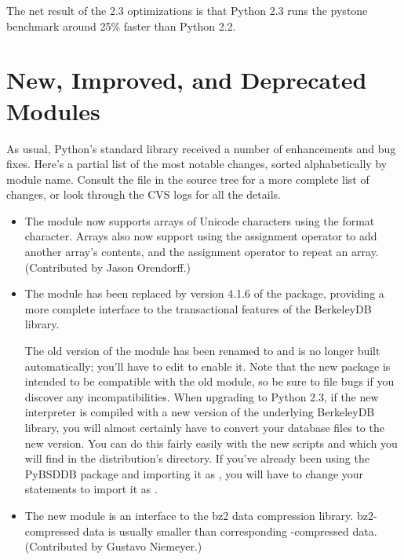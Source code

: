 \documentclass{howto}
\begin{document}
The net result of the 2.3 optimizations is that Python 2.3 runs the 
pystone benchmark around 25\% faster than Python 2.2.


\section{New, Improved, and Deprecated Modules}

As usual, Python's standard library received a number of enhancements and
bug fixes.  Here's a partial list of the most notable changes, sorted
alphabetically by module name. Consult the
 file in the source tree for a more
complete list of changes, or look through the CVS logs for all the
details.

\begin{itemize}

\item The  module now supports arrays of Unicode
characters using the  format character.  Arrays also now
support using the \code{+=} assignment operator to add another array's
contents, and the \code{*=} assignment operator to repeat an array.
(Contributed by Jason Orendorff.)

\item The  module has been replaced by version 4.1.6
of the  package,
providing a more complete interface to the transactional features of
the BerkeleyDB library.

The old version of the module has been renamed to 
 and is no longer built automatically; you'll 
have to edit  to enable it.  Note that the new
 package is intended to be compatible with the 
old module, so be sure to file bugs if you discover any
incompatibilities.  When upgrading to Python 2.3, if the new interpreter is compiled
with a new version of 
the underlying BerkeleyDB library, you will almost certainly have to
convert your database files to the new version.  You can do this
fairly easily with the new scripts  and
 which you will find in the distribution's
 directory.  If you've already been using the PyBSDDB
package and importing it as , you will have to change your
 statements to import it as .

\item The new  module is an interface to the bz2 data
compression library.  bz2-compressed data is usually smaller than 
corresponding -compressed data. (Contributed by Gustavo Niemeyer.)
 

\end{itemize}
\end{document}
